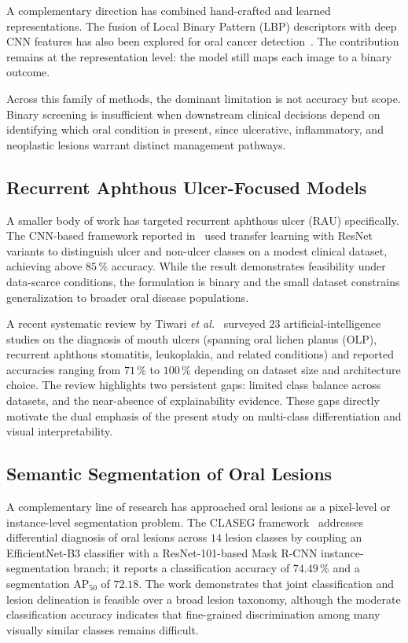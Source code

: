 A complementary direction has combined hand-crafted and learned
representations. The fusion of Local Binary Pattern (LBP) descriptors with deep
CNN features has also been explored for oral cancer detection~\cite{ref17}. The
contribution remains at the representation level: the model still maps each
image to a binary outcome.

Across this family of methods, the dominant limitation is not accuracy but
scope. Binary screening is insufficient when downstream clinical decisions
depend on identifying which oral condition is present, since ulcerative,
inflammatory, and neoplastic lesions warrant distinct management pathways.

\subsection{Recurrent Aphthous Ulcer-Focused Models}

A smaller body of work has targeted recurrent aphthous ulcer (RAU)
specifically. The CNN-based framework reported in~\cite{ref3} used transfer
learning with ResNet variants to distinguish ulcer and non-ulcer classes on a
modest clinical dataset, achieving above $85\,\%$ accuracy. While the result
demonstrates feasibility under data-scarce conditions, the formulation is
binary and the small dataset constrains generalization to broader oral disease
populations.

A recent systematic review by Tiwari \emph{et al.}~\cite{ref23} surveyed $23$
artificial-intelligence studies on the diagnosis of mouth ulcers (spanning
oral lichen planus (OLP), recurrent aphthous stomatitis, leukoplakia, and
related conditions) and reported accuracies ranging from $71\,\%$ to
$100\,\%$ depending on dataset size and architecture choice. The review
highlights two persistent gaps: limited class balance across datasets, and the
near-absence of explainability evidence. These gaps directly motivate the dual
emphasis of the present study on multi-class differentiation and visual
interpretability.

\subsection{Semantic Segmentation of Oral Lesions}

A complementary line of research has approached oral lesions as a pixel-level
or instance-level segmentation problem. The CLASEG framework~\cite{ref15}
addresses differential diagnosis of oral lesions across $14$ lesion classes by
coupling an EfficientNet-B3 classifier with a ResNet-101-based Mask R-CNN
instance-segmentation branch; it reports a classification accuracy of
$74.49\,\%$ and a segmentation $\mathrm{AP}_{50}$ of $72.18$. The work
demonstrates that joint classification and lesion delineation is feasible over
a broad lesion taxonomy, although the moderate classification accuracy
indicates that fine-grained discrimination among many visually similar classes
remains difficult.

